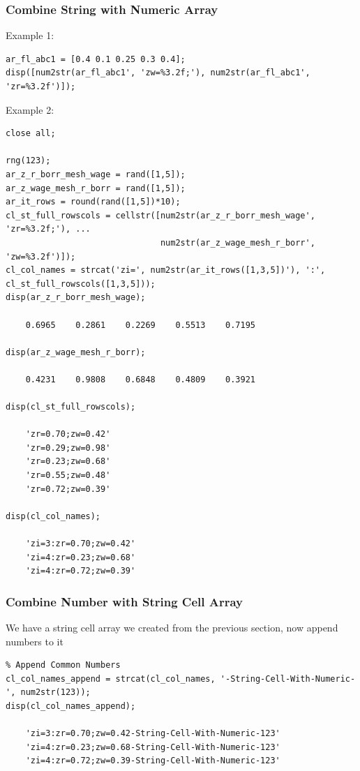 \documentclass[
]{book}
\begin{document}
\hypertarget{combine-string-with-numeric-array}{%
\subsubsection{Combine String with Numeric Array}\label{combine-string-with-numeric-array}}

Example 1:

\begin{verbatim}
ar_fl_abc1 = [0.4 0.1 0.25 0.3 0.4];
disp([num2str(ar_fl_abc1', 'zw=%3.2f;'), num2str(ar_fl_abc1', 'zr=%3.2f')]);
\end{verbatim}

Example 2:

\begin{verbatim}
close all;

rng(123);
ar_z_r_borr_mesh_wage = rand([1,5]);
ar_z_wage_mesh_r_borr = rand([1,5]);
ar_it_rows = round(rand([1,5])*10);
cl_st_full_rowscols = cellstr([num2str(ar_z_r_borr_mesh_wage', 'zr=%3.2f;'), ...
                               num2str(ar_z_wage_mesh_r_borr', 'zw=%3.2f')]);
cl_col_names = strcat('zi=', num2str(ar_it_rows([1,3,5])'), ':', cl_st_full_rowscols([1,3,5]));
disp(ar_z_r_borr_mesh_wage);

    0.6965    0.2861    0.2269    0.5513    0.7195

disp(ar_z_wage_mesh_r_borr);

    0.4231    0.9808    0.6848    0.4809    0.3921

disp(cl_st_full_rowscols);

    'zr=0.70;zw=0.42'
    'zr=0.29;zw=0.98'
    'zr=0.23;zw=0.68'
    'zr=0.55;zw=0.48'
    'zr=0.72;zw=0.39'

disp(cl_col_names);

    'zi=3:zr=0.70;zw=0.42'
    'zi=4:zr=0.23;zw=0.68'
    'zi=4:zr=0.72;zw=0.39'
\end{verbatim}

\hypertarget{combine-number-with-string-cell-array}{%
\subsubsection{Combine Number with String Cell Array}\label{combine-number-with-string-cell-array}}

We have a string cell array we created from the previous section, now
append numbers to it

\begin{verbatim}
% Append Common Numbers
cl_col_names_append = strcat(cl_col_names, '-String-Cell-With-Numeric-', num2str(123));
disp(cl_col_names_append);

    'zi=3:zr=0.70;zw=0.42-String-Cell-With-Numeric-123'
    'zi=4:zr=0.23;zw=0.68-String-Cell-With-Numeric-123'
    'zi=4:zr=0.72;zw=0.39-String-Cell-With-Numeric-123'
\end{verbatim}
\end{document}
